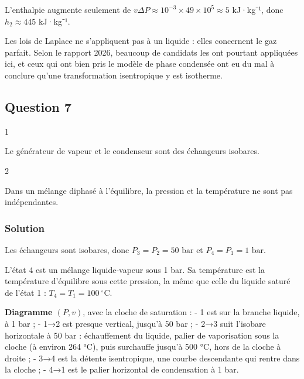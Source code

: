 \documentclass[11pt,a4paper]{article}
\begin{document}
L'enthalpie augmente seulement de \(v\Delta P\approx10^{-3}\times49\times10^5\approx5\) kJ·kg⁻¹, donc \(h_2\approx445\) kJ·kg⁻¹.

\begin{piege}

Les lois de Laplace ne s'appliquent pas à un liquide : elles concernent le gaz parfait. Selon le rapport 2026, beaucoup de candidats les ont pourtant appliquées ici, et ceux qui ont bien pris le modèle de phase condensée ont eu du mal à conclure qu'une transformation isentropique y est isotherme.

\end{piege}

\hypertarget{question-7}{%
\subsection{Question 7}\label{question-7}}

\begin{indication}{1}

Le générateur de vapeur et le condenseur sont des échangeurs isobares.

\end{indication}

\begin{indication}{2}

Dans un mélange diphasé à l'équilibre, la pression et la température ne sont pas indépendantes.

\end{indication}

\hypertarget{solution-6}{%
\subsubsection{Solution}\label{solution-6}}

Les échangeurs sont isobares, donc \(\boxed{P_3=P_2=50\text{ bar}}\) et \(\boxed{P_4=P_1=1\text{ bar}}\).

L'état 4 est un mélange liquide-vapeur sous 1 bar. Sa température est la température d'équilibre sous cette pression, la même que celle du liquide saturé de l'état 1 : \(\boxed{T_4=T_1=100\ ^\circ\text{C}}\).

\textbf{Diagramme \((P,v)\)}, avec la cloche de saturation :
- 1 est sur la branche liquide, à 1 bar ;
- 1→2 est presque vertical, jusqu'à 50 bar ;
- 2→3 suit l'isobare horizontale à 50 bar : échauffement du liquide, palier de vaporisation sous la cloche (à environ 264 °C), puis surchauffe jusqu'à 500 °C, hors de la cloche à droite ;
- 3→4 est la détente isentropique, une courbe descendante qui rentre dans la cloche ;
- 4→1 est le palier horizontal de condensation à 1 bar.
\end{document}
